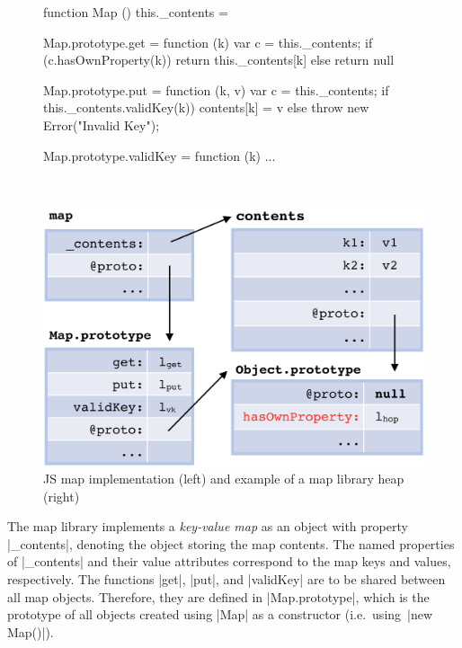  \begin{figure}[t!]
 \begin{minipage}{0.5\textwidth}
 \begin{lstjs}[firstnumber=1]
function Map () { this._contents = {} }

Map.prototype.get = function (k) {
  var c = this._contents;
  if (c.hasOwnProperty(k)) {
    return this._contents[k] 
  } else { return null }
}

Map.prototype.put = function (k, v) {
  var c = this._contents;
  if this._contents.validKey(k)) {  
    contents[k] = v   
  } else
    throw new Error("Invalid Key");
} 

Map.prototype.validKey = function (k) { ... }
\end{lstjs}
\end{minipage}
\ 
 \begin{minipage}{0.4\textwidth}
 \hspace*{-1.2cm}
 \includegraphics[width=1\textwidth]{figures/mapDiagram.png}
 \end{minipage}
\caption{JS map implementation (left) and example of a map library heap (right) \label{map:example}}
\end{figure}

The map library implements a \emph{key-value map} as an object with property \jsinline|_contents|, denoting the object storing the map contents.  
The named properties of \jsinline|_contents| and their value attributes correspond to the map keys and values, respectively.
The functions \jsinline|get|, \jsinline|put|, and \jsinline|validKey| are to be shared between all map 
objects. Therefore, they are defined in \jsinline|Map.prototype|, which is the prototype 
of all objects created using \jsinline|Map| as a constructor (i.e.~using~\jsinline|new Map()|).

